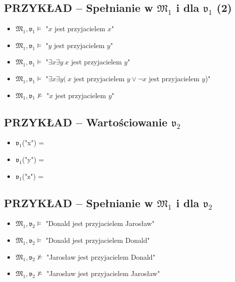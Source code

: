 \documentclass[12pt]{article}
\begin{document}
\subsection{PRZYKŁAD -- Spełnianie w $\mathfrak{M}_1$ i dla $\mathfrak{v}_1$ (2)}
%
\begin{itemize}
\item $\mathfrak{M}_1,\mathfrak{v}_1 \vDash$ "$x$ jest przyjacielem $x$"%
\item $\mathfrak{M}_1,\mathfrak{v}_1 \vDash$ "$y$ jest przyjacielem $y$"%
\item $\mathfrak{M}_1,\mathfrak{v}_1 \vDash$ "$\exists x \exists y ~x$ jest przyjacielem $y$"%
\item $\mathfrak{M}_1,\mathfrak{v}_1 \vDash$ "$\exists x \exists y ( ~x$ jest przyjacielem $y \lor \neg x$ jest przyjacielem $y$)"%
\item $\mathfrak{M}_1,\mathfrak{v}_1 \not \vDash$ "$x$ jest przyjacielem $y$"
\end{itemize}
%

\subsection{PRZYKŁAD -- Wartościowanie $\mathfrak{v}_2$}
%
\begin{itemize}
\item $\mathfrak{v}_1$("x") = \smiley{}
\item $\mathfrak{v}_1$("y") = \frownie{}
\item $\mathfrak{v}_1$("z") = \blacksmiley{}
\end{itemize}
%

\subsection{PRZYKŁAD -- Spełnianie w $\mathfrak{M}_1$ i dla $\mathfrak{v}_2$}
%
\begin{itemize}
\item $\mathfrak{M}_1,\mathfrak{v}_2 \vDash$ "Donald jest przyjacielem Jarosław"%
\item $\mathfrak{M}_1,\mathfrak{v}_2 \vDash$ "Donald jest przyjacielem Donald"%
\item $\mathfrak{M}_1,\mathfrak{v}_2 \not \vDash$ "Jarosław jest przyjacielem Donald"%
\item $\mathfrak{M}_1,\mathfrak{v}_2 \not \vDash$ "Jarosław jest przyjacielem Jarosław"
\end{itemize}
%
\end{document}
